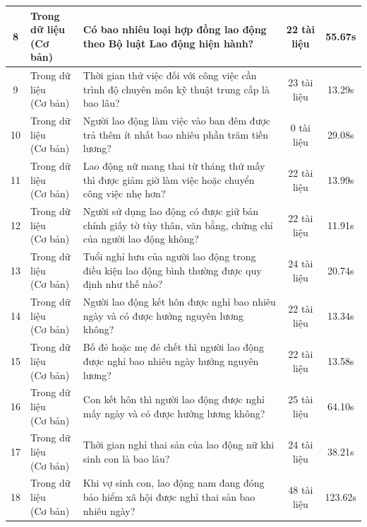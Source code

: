 \begin{longtable}{|c|l|p{6.5cm}|c|c|}
8 & \makecell[l]{Trong dữ liệu\\(Cơ bản)} & Có bao nhiêu loại hợp đồng lao động theo Bộ luật Lao động hiện hành? & 22 tài liệu & 55.67s \\ \hline
9 & \makecell[l]{Trong dữ liệu\\(Cơ bản)} & Thời gian thử việc đối với công việc cần trình độ chuyên môn kỹ thuật trung cấp là bao lâu? & 23 tài liệu & 13.29s \\ \hline
10 & \makecell[l]{Trong dữ liệu\\(Cơ bản)} & Người lao động làm việc vào ban đêm được trả thêm ít nhất bao nhiêu phần trăm tiền lương? & 0 tài liệu & 29.08s \\ \hline
11 & \makecell[l]{Trong dữ liệu\\(Cơ bản)} & Lao động nữ mang thai từ tháng thứ mấy thì được giảm giờ làm việc hoặc chuyển công việc nhẹ hơn? & 22 tài liệu & 13.99s \\ \hline
12 & \makecell[l]{Trong dữ liệu\\(Cơ bản)} & Người sử dụng lao động có được giữ bản chính giấy tờ tùy thân, văn bằng, chứng chỉ của người lao động không? & 22 tài liệu & 11.91s \\ \hline
13 & \makecell[l]{Trong dữ liệu\\(Cơ bản)} & Tuổi nghỉ hưu của người lao động trong điều kiện lao động bình thường được quy định như thế nào? & 24 tài liệu & 20.74s \\ \hline
14 & \makecell[l]{Trong dữ liệu\\(Cơ bản)} & Người lao động kết hôn được nghỉ bao nhiêu ngày và có được hưởng nguyên lương không? & 22 tài liệu & 13.34s \\ \hline
15 & \makecell[l]{Trong dữ liệu\\(Cơ bản)} & Bố đẻ hoặc mẹ đẻ chết thì người lao động được nghỉ bao nhiêu ngày hưởng nguyên lương? & 22 tài liệu & 13.58s \\ \hline
16 & \makecell[l]{Trong dữ liệu\\(Cơ bản)} & Con kết hôn thì người lao động được nghỉ mấy ngày và có được hưởng lương không? & 25 tài liệu & 64.10s \\ \hline
17 & \makecell[l]{Trong dữ liệu\\(Cơ bản)} & Thời gian nghỉ thai sản của lao động nữ khi sinh con là bao lâu? & 24 tài liệu & 38.21s \\ \hline
18 & \makecell[l]{Trong dữ liệu\\(Cơ bản)} & Khi vợ sinh con, lao động nam đang đóng bảo hiểm xã hội được nghỉ thai sản bao nhiêu ngày? & 48 tài liệu & 123.62s \\ \hline

\end{longtable}
